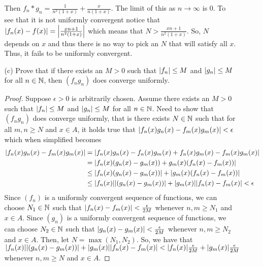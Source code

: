 \documentclass[12pt,letterpaper]{article}
\begin{document}
\begin{itemize}[leftmargin=!,labelindent=5pt]
\begin{itemize}
                    Then $f_n * g_n = \frac{1}{n^2(1+x)} + \frac{x}{n(1+x)}$.
                    The limit of this as $n \to \infty$ is $0$.
                    To see that it is not uniformly convergent notice that $\abs{f_n(x) - f(x)} = \abs{\frac{xn+1}{n^2(1+x)}}$ which means that $N > \frac{xn+1}{n^2(1+x)}$.
                    So, $N$ depends on $x$ and thus there is no way to pick an $N$ that will satisfy all $x$.
                    Thus, it fails to be uniformly convergent.
                \item [(c)] Prove that if there exists an $M > 0$ such that $\abs{f_n}\leq M$ and $\abs{g_n} \leq M$ for all $n \in \mathbb{N}$, then $(f_n g_n)$ does converge uniformly.
                    \begin{proof}
                        Suppose $\epsilon > 0$ is arbitrarily chosen.
                        Assume there exists an $M > 0$ such that $\abs{f_n}\leq M$ and $\abs{g_n} \leq M$ for all $n \in \mathbb{N}$.
                        Need to show that $(f_n g_n)$ does converge uniformly, that is there exists $N \in \mathbb{N}$ such that for all $m,n \geq N$ and $x\in A$, it holds true that $\abs{f_n(x)g_n(x) - f_m(x)g_m(x)} < \epsilon$ which when simplified becomes
                        \begin{align*}
                            \abs{f_n(x)g_n(x) - f_m(x)g_m(x)} &= \abs{f_n(x)g_n(x) - f_n(x)g_m(x) + f_n(x)g_m(x) - f_m(x)g_m(x)}\\
                            &= \abs{f_n(x)(g_n(x) - g_m(x)) + g_m(x) (f_n(x) - f_m(x))}\\
                            &\leq \abs{f_n(x)(g_n(x) - g_m(x))} + \abs{g_m(x) (f_n(x) - f_m(x))}\\
                            &\leq \abs{f_n(x)}\abs{(g_n(x) - g_m(x))} + \abs{g_m(x)}\abs{f_n(x) - f_m(x)} < \epsilon
                        \end{align*}
                        Since $(f_n)$ is a uniformly convergent sequence of functions, we can choose $N_1 \in \mathbb{N}$ such that $\abs{f_n(x) - f_m(x)} < \frac{\epsilon}{2M}$ whenever $n,m \geq N_1$ and $x \in A$.
                        Since $(g_n)$ is a uniformly convergent sequence of functions, we can choose $N_2 \in \mathbb{N}$ such that $\abs{g_n(x) - g_m(x)} < \frac{\epsilon}{2M}$ whenever $n,m \geq N_2$ and $x \in A$.
                        Then, let $N = \max(N_1, N_2)$.
                        So, we have that $\abs{f_n(x)}\abs{(g_n(x) - g_m(x))} + \abs{g_m(x)}\abs{f_n(x) - f_m(x)} < \abs{f_n(x)}\frac{\epsilon}{2M} + \abs{g_m(x)}\frac{\epsilon}{2M}$ whenever $n,m \geq N$ and $x \in A$.

\end{proof}
\end{itemize}
\end{itemize}
\end{document}
